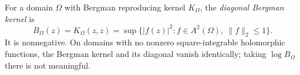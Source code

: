
For a domain $\Omega$ with Bergman reproducing kernel $K_\Omega$, the \emph{diagonal Bergman kernel} is
\[
B_\Omega(z)=K_\Omega(z,z)=\sup\bigl\{|f(z)|^2:f\in A^2(\Omega),\ \|f\|_2\le1\bigr\}.
\]
It is nonnegative. On domains with no nonzero square-integrable holomorphic functions, the Bergman kernel and its diagonal vanish identically; taking $\log B_\Omega$ there is not meaningful.
